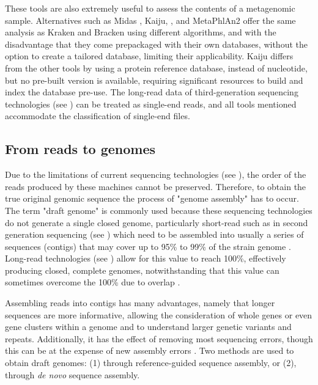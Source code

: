 These tools are also extremely useful to assess the contents of a metagenomic sample. Alternatives such as Midas \citep{nayfach_integrated_2016}, Kaiju, \citep{menzel_fast_2016}, and MetaPhlAn2 \citep{truong_metaphlan2_2015} offer the same analysis as Kraken and Bracken using different algorithms, and with the disadvantage that they come prepackaged with their own databases, without the option to create a tailored database, limiting their applicability. Kaiju differs from the other tools by using a protein reference database, instead of nucleotide, but no pre-built version is available, requiring significant resources to build and index the database pre-use. The long-read data of third-generation sequencing technologies (see ) can be treated as single-end reads, and all tools mentioned accommodate the classification of single-end files. 

\subsection{From reads to genomes} \label{ssec:_intro_reads_2_genomes}

Due to the limitations of current sequencing technologies (see ), the order of the reads produced by these machines cannot be preserved. 
Therefore, to obtain the true original genomic sequence the process of "genome assembly" has to occur. 
The term "draft genome" is commonly used because these sequencing technologies do not generate a single closed genome, particularly short-read such as in second generation sequencing (see ) which need to be assembled into usually a series of sequences (contigs) that may cover up to 95\% to 99\% of the strain genome \citep{carrico_primer_2018}. 
Long-read technologies (see ) allow for this value to reach 100\%, effectively producing closed, complete genomes, notwithstanding that this value can sometimes overcome the 100\% due to overlap \citep{wick_benchmarking_2021}. 

Assembling reads into contigs has many advantages, namely that longer sequences are more informative, allowing the consideration of whole genes or even gene clusters within a genome and to understand larger genetic variants and repeats. Additionally, it has the effect of removing most sequencing errors, though this can be at the expense of new assembly errors \citep{ayling_new_2020}. Two methods are used to obtain draft genomes: (1) through reference-guided sequence assembly, or (2), through \textit{de novo} sequence assembly.

